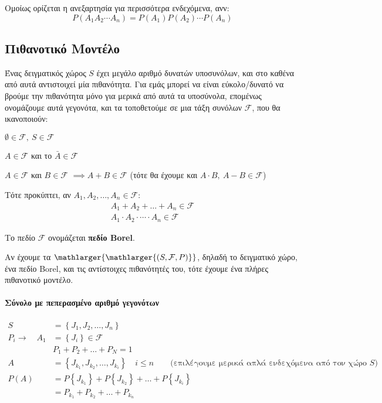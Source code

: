 \documentclass[11pt,a4paper,notitlepage,fleqn,final]{article}
\begin{document}
	Ομοίως ορίζεται η ανεξαρτησία για περισσότερα ενδεχόμενα, ανν:
	\[
	P(A_1A_2\cdots A_n) = P(A_1)P(A_2)\cdots P(A_n)
	\]

	\subsection{Πιθανοτικό Μοντέλο}
	Ένας δειγματικός χώρος \( S \) έχει μεγάλο αριθμό δυνατών υποσυνόλων,
	και στο καθένα από αυτά αντιστοιχεί μία πιθανότητα. Για εμάς μπορεί
	να είναι εύκολο/δυνατό να βρούμε την πιθανότητα μόνο για μερικά
	από αυτά τα υποσύνολα, επομένως ονομάζουμε αυτά γεγονότα, και τα
	τοποθετούμε σε μια τάξη συνόλων \( \mathcal F \), που θα ικανοποιούν:

	\begin{enumroman}
		\item \( \emptyset \in \mathcal F,\
		S \in \mathcal{F}
		 \)
		\item \( A \in \mathcal F \) και το \( \bar A \in \mathcal F \)
		\item \( A \in \mathcal F \) και \( B \in \mathcal F \)
		\( \implies A + B \in \mathcal F \) \quad
		(τότε θα έχουμε και \( A\cdot B,\ A-B \in \mathcal F \))
	\end{enumroman}

	Τότε προκύπτει, αν \( A_1,A_2,\dots,A_n \in \mathcal F \):
	\begin{gather*}
		A_1+A_2+\dots +A_n \in \mathcal F \\
		A_1\cdot A_2 \cdot \cdots \cdot A_n \in \mathcal F
	\end{gather*}

	Το πεδίο \( \mathcal F \) ονομάζεται \textbf{πεδίο Borel}.

	Αν έχουμε τα \( \mathlarger{\mathlarger{(S,\mathcal F,P)}} \),
	δηλαδή το
	δειγματικό χώρο, ένα πεδίο Borel, και τις αντίστοιχες πιθανότητές
	του, τότε έχουμε ένα πλήρες πιθανοτικό μοντέλο.

	\paragraph{Σύνολο με πεπερασμένο αριθμό γεγονότων}
	\begin{align*}
		S &= \left\lbrace J_1,J_2,\dots,J_n \right\rbrace \\
		P_i \to \quad A_1 &=
		\left\lbrace J_i \right\rbrace \in \mathcal F \\
		& P_1+P_2+\dots+P_N = 1 \\
		A &= \left\lbrace J_{k_1},J_{k_2},\dots,J_{k_i} \right\rbrace
		\quad i \leq n \qquad \text{(επιλέγουμε μερικά
			απλά ενδεχόμενα από τον χώρο $S$)} \\
		P(A) &= P\left\lbrace J_{k_1} \right\rbrace +
		P\left\lbrace J_{k_2} \right\rbrace + \dots +
		P\left\lbrace J_{k_i} \right\rbrace \\ &=
		P_{k_1} + P_{k_2} + \dots + P_{k_n}
	\end{align*}
\end{document}
